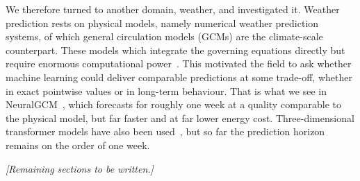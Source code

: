 We therefore turned to another domain, weather, and investigated it. Weather
prediction rests on physical models, namely numerical weather prediction
systems, of which general circulation models (GCMs) are the climate-scale
counterpart. These models
which integrate the governing equations directly but require enormous
computational power~\cite{kochkov2024}. This motivated the field to ask whether
machine learning could deliver comparable predictions at some trade-off, whether
in exact pointwise values or in long-term behaviour. That is what we see in
NeuralGCM~\cite{kochkov2024}, which forecasts for roughly one week at a quality
comparable to the physical model, but far faster and at far lower energy cost.
Three-dimensional transformer models have also been used~\cite{bi2023}, but so
far the prediction horizon remains on the order of one week.

\medskip

\noindent\emph{[Remaining sections to be written.]}


